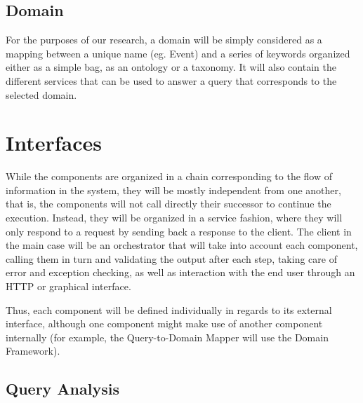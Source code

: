 
\subsection{Domain} %
\label{sub:domain}

For the purposes of our research, a domain will be simply considered as a mapping between a unique name (eg. Event) and a series of keywords organized either as a simple bag, as an ontology or a taxonomy. It will also contain the different services that can be used to answer a query that corresponds to the selected domain.


\section{Interfaces} %
\label{sec:interfaces}

While the components are organized in a chain corresponding to the flow of information in the system, they will be mostly independent from one another, that is, the components will not call directly their successor to continue the execution. Instead, they will be organized in a service fashion, where they will only respond to a request by sending back a response to the client. The client in the main case will be an orchestrator that will take into account each component, calling them in turn and validating the output after each step, taking care of error and exception checking, as well as interaction with the end user through an HTTP or graphical interface.

Thus, each component will be defined individually in regards to its external interface, although one component might make use of another component internally (for example, the Query-to-Domain Mapper will use the Domain Framework).

\subsection{Query Analysis} %
\label{sub:query_analysis}




